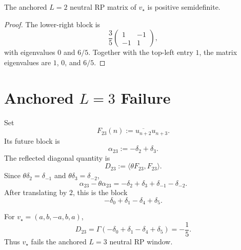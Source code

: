 \begin{corollary}[Pythagorean row passes anchored $L=2$ neutral RP]
\label{cor:innovation-input-pythagorean-ltwo-rp-passage}
The anchored $L=2$ neutral RP matrix of $v_\star$ is positive
semidefinite.
\end{corollary}

\begin{proof}
The lower-right block is
$$
\frac35
\left(
\begin{array}{cc}
1 & -1\\
-1 & 1
\end{array}
\right),
$$
with eigenvalues $0$ and $6/5$. Together with the top-left entry $1$, the
matrix eigenvalues are $1$, $0$, and $6/5$.
\end{proof}

\section{Anchored $L=3$ Failure}
\label{sec:innovation-input-pythagorean-lthree-failure}

\begin{definition}
\label{def:innovation-input-second-anchored-link}
Set
$$
F_{23}(n):=\overline{u_{n+2}}u_{n+3}.
$$
Its future block is
$$
\alpha_{23}:=-\delta_2+\delta_3.
$$
The reflected diagonal quantity is
$$
D_{23}:=\langle\theta F_{23},F_{23}\rangle.
$$
Since $\theta\delta_2=\delta_{-1}$ and
$\theta\delta_3=\delta_{-2}$,
$$
\alpha_{23}-\theta\alpha_{23}
=
-\delta_2+\delta_3+\delta_{-1}-\delta_{-2}.
$$
After translating by $2$, this is the block
$$
-\delta_0+\delta_1-\delta_4+\delta_5.
$$
\end{definition}

\begin{theorem}[Pythagorean anchored $L=3$ failure]
\label{thm:innovation-input-pythagorean-lthree-failure}
For $v_\star=(a,b,-a,b,a)$,
$$
D_{23}
=
\Gamma(-\delta_0+\delta_1-\delta_4+\delta_5)
=
-\frac15.
$$
Thus $v_\star$ fails the anchored $L=3$ neutral RP window.
\end{theorem}


